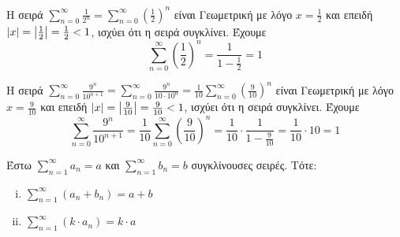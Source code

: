 \documentclass[a4paper,table]{report}
\begin{document}
\begin{examples}
\item Η σειρά $ \sum_{n=0}^{\infty} \frac{1}{2^{n}} = \sum_{n=0}^{\infty} 
    {\left(\frac{1}{2} \right)}^{n} $ είναι Γεωμετρική με λόγο $ x = \frac{1}{2} $ 
    και επειδή 
    $ \abs{x} = \abs{\frac{1}{2}} = \frac{1}{2} < 1  $, ισχύει ότι η σειρά συγκλίνει.
    Έχουμε
    \[
        \sum_{n=0}^{\infty} {\left(\frac{1}{2} \right)}^{n} = 
        \frac{1}{1 - \frac{1}{2}} = 1
    \] 

\item Η σειρά $ \sum_{n=0}^{\infty} \frac{9^{n}}{10^{n+1}} = 
    \sum_{n=0}^{\infty} \frac{9^{n}}{10 \cdot 10^{n}} = 
    \frac{1}{10} \sum_{n=0}^{\infty} {\left(\frac{9}{10} \right)}^{n} $ είναι
    Γεωμετρική με λόγο $ x = \frac{9}{10} $ και επειδή $ \abs{x} = 
    \abs{\frac{9}{10}} = \frac{9}{10} < 1$, ισχύει ότι η σειρά συγκλίνει.
    Έχουμε 
    \[
        \sum_{n=0}^{\infty}  \frac{9^{n}}{10^{n+1}} = 
        \frac{1}{10} \sum_{n=0}^{\infty} {\left(\frac{9}{10} \right)}^{n} = 
        \frac{1}{10} \cdot \frac{1}{1 - \frac{9}{10}} = \frac{1}{10} \cdot 10 = 1
    \]
\end{examples}

\begin{mybox3}
\begin{prop}
  Έστω $ \sum_{n=1}^{\infty} a_{n} = a $ και $ \sum_{n=1}^{\infty} b_{n} = b $ 
  συγκλίνουσες σειρές. Τότε:
  \begin{enumerate}[i)]
    \item $ \sum_{n=1}^{\infty} (a_{n}+b_{n}) = a+b $
    \item $ \sum_{n=1}^{\infty} (k\cdot a_{n}) = k\cdot a $ 
  \end{enumerate} \label{prop:sum1}
\end{prop}
\end{mybox3}
\end{document}
